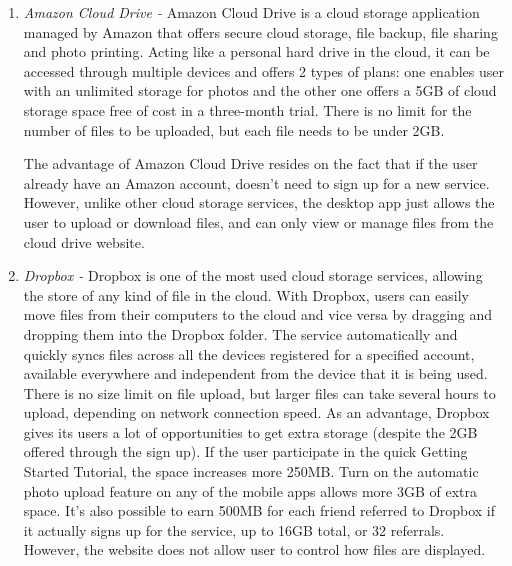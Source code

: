 \begin{enumerate}
\item {\it Amazon Cloud Drive -}
Amazon Cloud Drive is a cloud storage application managed by Amazon that offers secure cloud storage, file backup, file sharing and photo printing. Acting like a personal hard drive in the cloud, it can be accessed through multiple devices and offers 2 types of plans: one enables user with an unlimited storage for photos and the other one offers a 5GB of cloud storage space free of cost in a three-month trial.
There is no limit for the number of files to be uploaded, but each file needs to be under 2GB.

The advantage of Amazon Cloud Drive resides on the fact that if the user already have an Amazon account, doesn't need to sign up for a new service.
However, unlike other cloud storage services, the desktop app just allows the user to upload or download files, and can only view or manage files from the cloud drive website.\\

\item {\it Dropbox -}
Dropbox is one of the most used cloud storage services, allowing the store of any kind of file in the cloud. With Dropbox, users can easily move files from their computers to the cloud and vice versa by dragging and dropping them into the Dropbox folder.
The service automatically and quickly syncs files across all the devices registered for a specified account, available everywhere and independent from the device that it is being used. 
There is no size limit on file upload, but larger files can take several hours to upload, depending on network connection speed.
As an advantage, Dropbox gives its users a lot of opportunities to get extra storage (despite the 2GB offered through the sign up). If the user participate in the quick Getting Started Tutorial, the space increases more 250MB. Turn on the automatic photo upload feature on any of the mobile apps allows more 3GB of extra space. It's also possible to earn 500MB for each friend referred to Dropbox if it actually signs up for the service, up to 16GB total, or 32 referrals.
However, the website does not allow user to control how files are displayed.\\


\end{enumerate}
